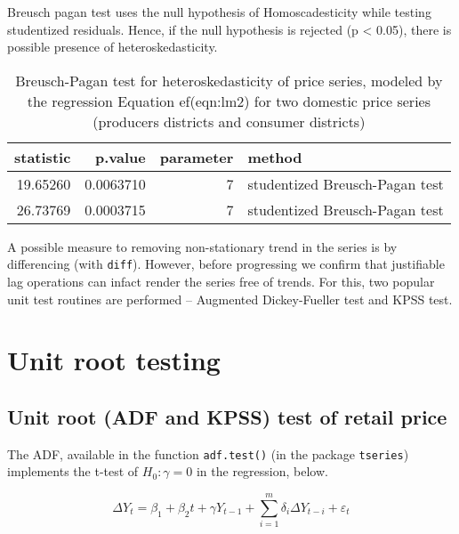 \documentclass[
  12pt,
]{article}
\begin{document}
Breusch pagan test uses the null hypothesis of Homoscadesticity while testing studentized residuals. Hence, if the null hypothesis is rejected (p \textless{} 0.05), there is possible presence of heteroskedasticity.

\begin{table}

\caption{\label{tab:lm2-bptest}Breusch-Pagan test for heteroskedasticity of price series, modeled by the regression Equation ef(eqn:lm2) for two domestic price series (producers districts and consumer districts)}
\centering
\begin{tabular}[t]{rrrl}
\toprule
statistic & p.value & parameter & method\\
\midrule
19.65260 & 0.0063710 & 7 & studentized Breusch-Pagan test\\
26.73769 & 0.0003715 & 7 & studentized Breusch-Pagan test\\
\bottomrule
\end{tabular}
\end{table}

A possible measure to removing non-stationary trend in the series is by differencing (with \texttt{diff}). However, before progressing we confirm that justifiable lag operations can infact render the series free of trends. For this, two popular unit test routines are performed -- Augmented Dickey-Fueller test and KPSS test.

\hypertarget{unit-root-testing}{%
\section{Unit root testing}\label{unit-root-testing}}

\hypertarget{unit-root-adf-and-kpss-test-of-retail-price}{%
\subsection{Unit root (ADF and KPSS) test of retail price}\label{unit-root-adf-and-kpss-test-of-retail-price}}

The ADF, available in the function \texttt{adf.test()} (in the package \texttt{tseries}) implements the t-test of \(H_0: \gamma = 0\) in the regression, below.

\begin{equation}
\label{eqn:lagged-ts-regression}
  \Delta {{Y}_{t}}={{\beta
  }_{1}}+{{\beta }_{2}}t+\gamma {{Y}_{t-1}}+ \sum\limits_{i=1}^{m}{\delta_i \Delta
    {{Y}_{t-i}}+{{\varepsilon }_{t}}}
\end{equation}
\end{document}
